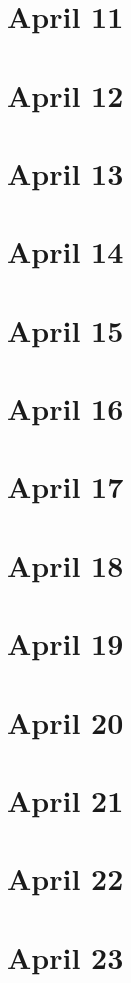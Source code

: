 \section{April 11}

\section{April 12}

\section{April 13}

\section{April 14}

\section{April 15}

\section{April 16}

\section{April 17}

\section{April 18}

\section{April 19}

\section{April 20}

\section{April 21}

\section{April 22}

\section{April 23}

